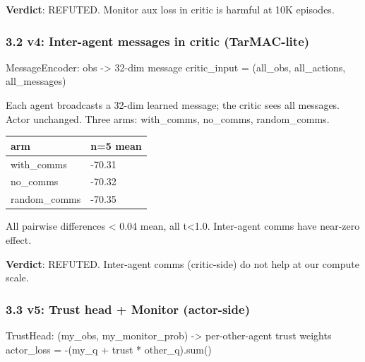 \documentclass[
]{article}
\newenvironment{Shaded}{}{}
\newcommand{\BuiltInTok}[1]{\textcolor[rgb]{0.00,0.50,0.00}{#1}}
\newcommand{\DecValTok}[1]{\textcolor[rgb]{0.25,0.63,0.44}{#1}}
\newcommand{\NormalTok}[1]{#1}
\newcommand{\OperatorTok}[1]{\textcolor[rgb]{0.40,0.40,0.40}{#1}}
\newcounter{none} %
\begin{document}
\textbf{Verdict}: REFUTED. Monitor aux loss in critic is harmful at 10K
episodes.

\subsubsection{3.2 v4: Inter-agent messages in critic
(TarMAC-lite)}\label{v4-inter-agent-messages-in-critic-tarmac-lite}

\begin{Shaded}
\begin{Highlighting}[]
\NormalTok{MessageEncoder: obs }\OperatorTok{{-}\textgreater{}} \DecValTok{32}\OperatorTok{{-}}\NormalTok{dim message}
\NormalTok{critic\_input }\OperatorTok{=}\NormalTok{ (all\_obs, all\_actions, all\_messages)}
\end{Highlighting}
\end{Shaded}

Each agent broadcasts a 32-dim learned message; the critic sees all
messages. Actor unchanged. Three arms: with\_comms, no\_comms,
random\_comms.

{\def\LTcaptype{none} %
\begin{longtable}[]{@{}ll@{}}
\toprule\noalign{}
arm & n=5 mean \\
\midrule\noalign{}
\endhead
\bottomrule\noalign{}
\endlastfoot
with\_comms & -70.31 \\
no\_comms & -70.32 \\
random\_comms & -70.35 \\
\end{longtable}
}

All pairwise differences \textless{} 0.04 mean, all t\textless1.0.
Inter-agent comms have near-zero effect.

\textbf{Verdict}: REFUTED. Inter-agent comms (critic-side) do not help
at our compute scale.

\subsubsection{3.3 v5: Trust head + Monitor
(actor-side)}\label{v5-trust-head-monitor-actor-side}

\begin{Shaded}
\begin{Highlighting}[]
\NormalTok{TrustHead: (my\_obs, my\_monitor\_prob) }\OperatorTok{{-}\textgreater{}}\NormalTok{ per}\OperatorTok{{-}}\NormalTok{other}\OperatorTok{{-}}\NormalTok{agent trust weights}
\NormalTok{actor\_loss }\OperatorTok{=} \OperatorTok{{-}}\NormalTok{(my\_q }\OperatorTok{+}\NormalTok{ trust }\OperatorTok{*}\NormalTok{ other\_q).}\BuiltInTok{sum}\NormalTok{()}
\end{Highlighting}
\end{Shaded}
\end{document}
